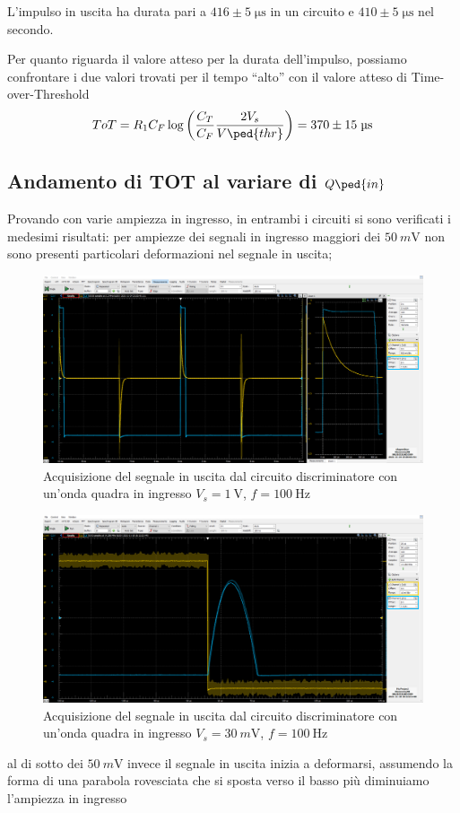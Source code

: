 \documentclass[10pt,a4paper]{article}
\begin{document}
L'impulso in uscita ha durata pari a $416 \pm 5 \; \si{\micro\s}$ in un circuito e $410 \pm 5 \; \si{\micro\s}$ nel secondo.

Per quanto riguarda il valore atteso per la durata dell'impulso, possiamo
confrontare i due valori trovati per il tempo ``alto'' con il valore atteso
di Time-over-Threshold
\[
ToT = R_1 C_F \log\left(\frac{C_T}{C_F} \frac{2 V_s}{V\ped{thr}}\right) =
370 \pm 15 \; \si{\micro\s}
\]


\subsection{Andamento di TOT al variare di $Q\ped{in}$}
Provando con varie ampiezza in ingresso, in entrambi i circuiti si sono
verificati i medesimi risultati: per ampiezze dei segnali in ingresso maggiori
dei $\SI{50}{m\V}$ non sono presenti particolari deformazioni nel segnale
in uscita;
\begin{figure}[htbp]
\centering
\includegraphics[scale=0.335]{shaper_discrzoom}
\caption{Acquisizione del segnale in uscita dal circuito discriminatore con
un'onda quadra in ingresso $V_s = \SI{1}{\V}$, $f = \SI{100}{\Hz}$
\label{fig: shaperdiscr}}
\end{figure}

\begin{figure}[htbp]
\centering
\includegraphics[scale=0.335]{discr_sat}
\caption{Acquisizione del segnale in uscita dal circuito discriminatore con
un'onda quadra in ingresso $V_s = \SI{30}{m\V}$, $f = \SI{100}{\Hz}$
\label{fig: discr_sat}}
\end{figure}
al di sotto dei $\SI{50}{m\V}$ invece il segnale in uscita inizia a deformarsi,
assumendo la forma di una parabola rovesciata che si sposta verso il basso
più diminuiamo l'ampiezza in ingresso
\end{document}
